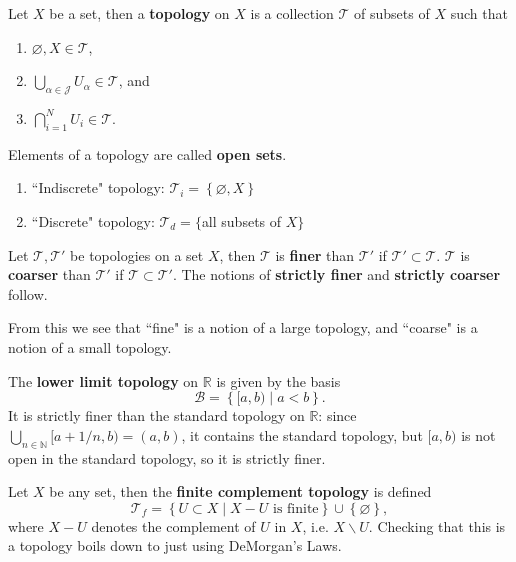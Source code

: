 \documentclass[10pt]{report}
\begin{document}
\begin{defn}
	Let $X$ be a set, then a \textbf{topology} on $X$ is a collection $\mathcal{T}$ of subsets of $X$ such that
	\begin{enumerate}
		\item $\varnothing, X \in \mathcal{T}$,
		\item $\bigcup_{\alpha\in \mathcal{J}}U_\alpha \in \mathcal{T}$, and
		\item $\bigcap_{i=1}^N U_i \in \mathcal{T}$.
	\end{enumerate}
	Elements of a topology are called \textbf{open sets}.
\end{defn}

\begin{ex}
\begin{enumerate}
	\item ``Indiscrete" topology: $\mathcal{T}_i = \left\{ \varnothing, X \right\}$ 
	\item ``Discrete" topology: $\mathcal{T}_d =\{$all subsets of $X\}$
\end{enumerate}
\end{ex}

\begin{defn}
	Let $\mathcal{T},\mathcal{T}'$ be topologies on a set $X$, then $\mathcal{T}$ is \textbf{finer} than $\mathcal{T}'$ if $\mathcal{T}' \subset \mathcal{T}$. $\mathcal{T}$ is \textbf{coarser} than $\mathcal{T}'$ if $\mathcal{T} \subset \mathcal{T}'$. The notions of \textbf{strictly finer} and \textbf{strictly coarser} follow.
\end{defn}

From this we see that ``fine" is a notion of a large topology, and ``coarse" is a notion of a small topology.

\begin{ex}[]
	The \textbf{lower limit topology} on $\mathbb{R}$ is given by the basis
	\[
		\mathcal{B}= \left\{ [a,b) \;|\; a < b \right\}.
	\] It is strictly finer than the standard topology on $\mathbb{R}$: since $\bigcup_{n\in \mathbb{N}}[a + 1/n, b)=(a,b)$, it contains the standard topology, but $[a,b)$ is not open in the standard topology, so it is strictly finer.
\end{ex}

\begin{ex}[]
	Let $X$ be any set, then the \textbf{finite complement topology} is defined
	\[
		\mathcal{T}_f = \left\{ U \subset X \;|\; X-U \text{ is finite} \right\} \cup\left\{ \varnothing \right\},
	\] 
	where $X-U$ denotes the complement of $U$ in $X$, i.e. $X \backslash U$. Checking that this is a topology boils down to just using DeMorgan's Laws.
\end{ex}
\end{document}
